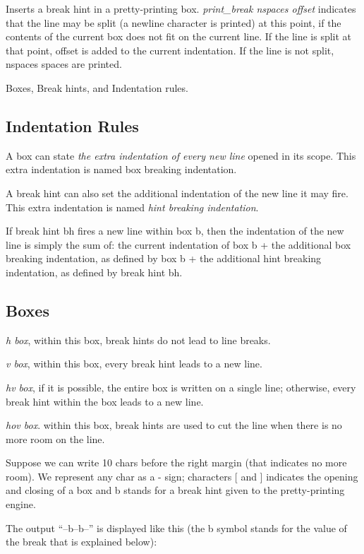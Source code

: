 Inserts a break hint in a pretty-printing box. \textit{print\_break nspaces
offset} indicates that the line may be split (a newline character is
printed) at this point, if the contents of the current box does not
fit on the current line. If the line is split at that point, offset is
added to the current indentation. If the line is not split, nspaces
spaces are printed.


Boxes, Break hints, and Indentation rules.

\subsection{Indentation Rules}
\label{sec:indentation-rules}

A box can state \textit{the extra indentation of every new line} opened in its
scope. This extra indentation is named box breaking indentation.

A break hint can also set the additional indentation of the new line
it may fire. This extra indentation is named \textit{hint breaking
  indentation}.

If break hint bh fires a new line within box b, then the indentation
of the new line is simply the sum of: the current indentation of box b
+ the additional box breaking indentation, as defined by box b + the
additional hint breaking indentation, as defined by break hint bh.

\subsection{Boxes}
\label{sec:boxes}

\textit{h box}, within this box, break hints do not lead to line
breaks.

\textit{v box}, within this box, every break hint leads to a new line.

\textit{hv box}, if it is possible, the entire box is written on a
single line; otherwise, every break hint within the box leads to a new
line.

\textit{hov box}. within this box, break hints are used to cut the
line when there is no more room on the line.


Suppose we can write 10 chars before the right margin (that indicates
no more room). We represent any char as a - sign; characters [ and ]
indicates the opening and closing of a box and b stands for a break
hint given to the pretty-printing engine.

The output ``--b--b--'' is displayed like this (the b symbol stands
for the value of the break that is explained below):

